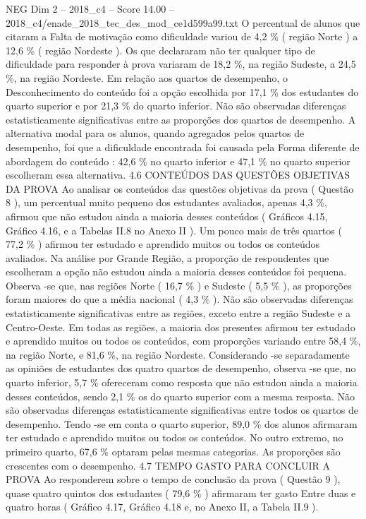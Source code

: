 \begin{textsample}{NEG Dim 2 – 2018\_c4 – Score 14.00 – 2018\_c4/enade\_2018\_tec\_des\_mod\_ce1d599a99.txt}
O percentual de alunos que citaram a Falta de motivação como dificuldade variou de 4,2 \% ( região Norte ) a 12,6 \% ( região Nordeste ).
Os que declararam não ter qualquer tipo de dificuldade para responder à prova variaram de 18,2 \%, na região Sudeste, a 24,5 \%, na região Nordeste.
Em relação aos quartos de desempenho, o Desconhecimento do conteúdo foi a opção escolhida por 17,1 \% dos estudantes do quarto superior e por 21,3 \% do quarto inferior.
Não são observadas diferenças estatisticamente significativas entre as proporções dos quartos de desempenho.
A alternativa modal para os alunos, quando agregados pelos quartos de desempenho, foi que a dificuldade encontrada foi causada pela Forma diferente de abordagem do conteúdo : 42,6 \% no quarto inferior e 47,1 \% no quarto superior escolheram essa alternativa. 4.6 CONTEÚDOS DAS QUESTÕES OBJETIVAS DA PROVA Ao analisar os conteúdos das questões objetivas da prova ( Questão 8 ), um percentual muito pequeno dos estudantes avaliados, apenas 4,3 \%, afirmou que não estudou ainda a maioria desses conteúdos ( Gráficos 4.15, Gráfico 4.16, e a Tabelas II.8 no Anexo II ).
Um pouco mais de três quartos ( 77,2 \% ) afirmou ter estudado e aprendido muitos ou todos os conteúdos avaliados.
Na análise por Grande Região, a proporção de respondentes que escolheram a opção não estudou ainda a maioria desses conteúdos foi pequena.
Observa -se que, nas regiões Norte ( 16,7 \% ) e Sudeste ( 5,5 \% ), as proporções foram maiores do que a média nacional ( 4,3 \% ).
Não são observadas diferenças estatisticamente significativas entre as regiões, exceto entre a região Sudeste e a Centro-Oeste.
Em todas as regiões, a maioria dos presentes afirmou ter estudado e aprendido muitos ou todos os conteúdos, com proporções variando entre 58,4 \%, na região Norte, e 81,6 \%, na região Nordeste.
Considerando -se separadamente as opiniões de estudantes dos quatro quartos de desempenho, observa -se que, no quarto inferior, 5,7 \% ofereceram como resposta que não estudou ainda a maioria desses conteúdos, sendo 2,1 \% os do quarto superior com a mesma resposta.
Não são observadas diferenças estatisticamente significativas entre todos os quartos de desempenho.
Tendo -se em conta o quarto superior, 89,0 \% dos alunos afirmaram ter estudado e aprendido muitos ou todos os conteúdos.
No outro extremo, no primeiro quarto, 67,6 \% optaram pelas mesmas categorias.
As proporções são crescentes com o desempenho. 4.7 TEMPO GASTO PARA CONCLUIR A PROVA Ao responderem sobre o tempo de conclusão da prova ( Questão 9 ), quase quatro quintos dos estudantes ( 79,6 \% ) afirmaram ter gasto Entre duas e quatro horas ( Gráfico 4.17, Gráfico 4.18 e, no Anexo II, a Tabela II.9 ).

\end{textsample}

